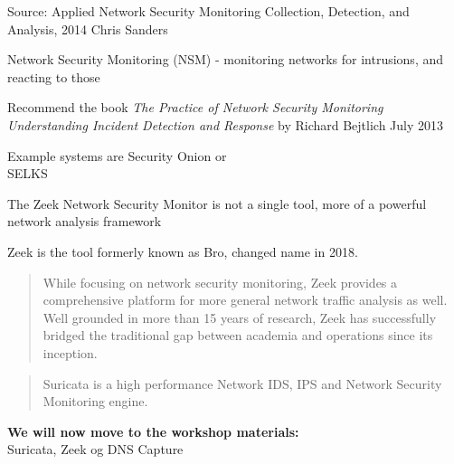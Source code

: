 \documentclass[Screen16to9,17pt]{foils}
\begin{document}
Source: Applied Network Security Monitoring Collection, Detection, and Analysis, 2014 Chris Sanders



\begin{list1}
\item Network Security Monitoring (NSM) - monitoring networks for intrusions, and reacting to those
\item Recommend the book \emph{The Practice of Network Security Monitoring
Understanding Incident Detection and Response}
by Richard Bejtlich
July 2013
\item Example systems are Security Onion  or\\ SELKS 
\end{list1}





The Zeek Network Security Monitor is not a single tool, more of a
powerful network analysis framework

Zeek is the tool formerly known as Bro, changed name in 2018. 




\begin{quote}
While focusing on network security monitoring, Zeek provides a comprehensive platform for more general network traffic analysis as well. Well grounded in more than 15 years of research, Zeek has successfully bridged the traditional gap between academia and operations since its inception.
\end{quote}




\begin{quote}
Suricata is a high performance Network IDS, IPS and Network Security Monitoring engine.
\end{quote}


{\bf We will now move to the workshop materials:}\\
Suricata, Zeek og DNS Capture\\
{\small{}}



\slidenext
\end{document}
